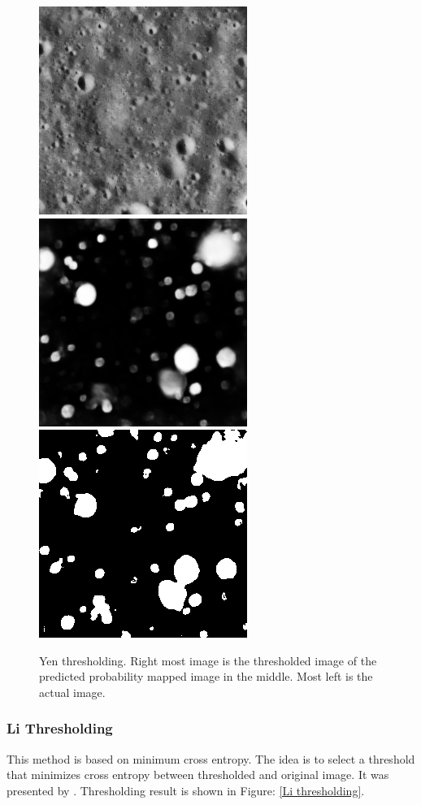 \documentclass[11pt]{article}
\begin{document}
\begin{figure}[H]
	\includegraphics[width=.3\textwidth]{files/results/26.png}\hfill	
	\includegraphics[width=.3\textwidth]{files/results/26_predict.png}\hfill
	\includegraphics[width=.3\textwidth]{files/results/yen.png}\hfill
	\caption{Yen thresholding. Right most image is the thresholded image of the predicted probability mapped image in the middle. Most left is the actual image.}
	\label{Yen thresholding}
\end{figure}

\subsubsection{Li Thresholding}
This method is based on minimum cross entropy. The idea is to select a threshold that minimizes cross entropy between thresholded and original image. It was presented by \cite{li1993minimum}. Thresholding result is shown in Figure: \ref{Li thresholding}.
\end{document}

